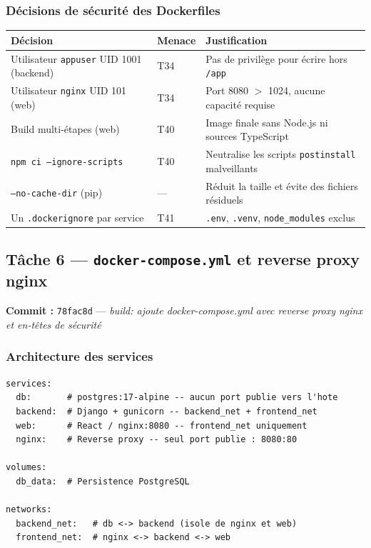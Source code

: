 \documentclass[11pt,a4paper]{article}
\begin{document}
\subsubsection*{Décisions de sécurité des Dockerfiles}

\begin{center}
\renewcommand{\arraystretch}{1.3}
\begin{tabular}{p{5.5cm}p{3cm}p{5cm}}
  \toprule
  \textbf{Décision} & \textbf{Menace} & \textbf{Justification} \\
  \midrule
  Utilisateur \texttt{appuser} UID 1001 (backend) & T34 &
    Pas de privilège pour écrire hors \texttt{/app} \\
  Utilisateur \texttt{nginx} UID 101 (web) & T34 &
    Port 8080 $>$ 1024, aucune capacité requise \\
  Build multi-étapes (web) & T40 &
    Image finale sans Node.js ni sources TypeScript \\
  \texttt{npm ci --ignore-scripts} & T40 &
    Neutralise les scripts \texttt{postinstall} malveillants \\
  \texttt{--no-cache-dir} (pip) & --- &
    Réduit la taille et évite des fichiers résiduels \\
  Un \texttt{.dockerignore} par service & T41 &
    \texttt{.env}, \texttt{.venv}, \texttt{node\_modules} exclus \\
  \bottomrule
\end{tabular}
\end{center}

\subsection{Tâche 6 --- \texttt{docker-compose.yml} et reverse proxy nginx}

\textbf{Commit :} \texttt{78fac8d} --- \textit{build: ajoute docker-compose.yml avec reverse
proxy nginx et en-têtes de sécurité}

\subsubsection*{Architecture des services}

\begin{lstlisting}[caption={Vue d'ensemble du docker-compose.yml}]
services:
  db:       # postgres:17-alpine -- aucun port publie vers l'hote
  backend:  # Django + gunicorn -- backend_net + frontend_net
  web:      # React / nginx:8080 -- frontend_net uniquement
  nginx:    # Reverse proxy -- seul port publie : 8080:80

volumes:
  db_data:  # Persistence PostgreSQL

networks:
  backend_net:   # db <-> backend (isole de nginx et web)
  frontend_net:  # nginx <-> backend <-> web
\end{lstlisting}
\end{document}
